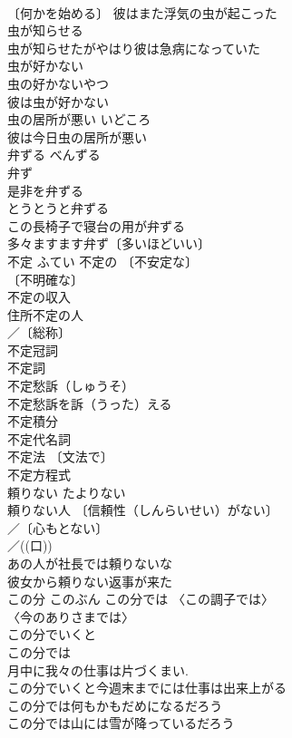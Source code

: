 \documentclass[8pt]{extreport}
\begin{document}
\begin{CJK}{UTF8}{min}
\\	〔何かを始める〕 彼はまた浮気の虫が起こった 
\\	虫が知らせる		
\\	虫が知らせたがやはり彼は急病になっていた 
\\	虫が好かない		
\\	虫の好かないやつ 
\\	彼は虫が好かない 
\\	虫の居所が悪い	いどころ	
\\	彼は今日虫の居所が悪い 
\\	弁ずる	べんずる	
\\	弁ず 
\\	是非を弁ずる 
\\	とうとうと弁ずる 
\\	この長椅子で寝台の用が弁ずる 
\\	多々ますます弁ず〔多いほどいい〕 
\\	不定	ふてい	不定の 〔不安定な〕
\\	〔不明確な〕
\\	不定の収入 
\\	住所不定の人 
\\	／〔総称〕
\\	不定冠詞 
\\	不定詞 
\\	不定愁訴（しゅうそ） 
\\	不定愁訴を訴（うった）える 
\\	不定積分 
\\	不定代名詞 
\\	不定法 〔文法で〕
\\	不定方程式 
\\	頼りない	たよりない	
\\	頼りない人 〔信頼性（しんらいせい）がない〕
\\	／〔心もとない〕
\\	／((口)) 
\\	あの人が社長では頼りないな 
\\	彼女から頼りない返事が来た 
\\	この分	このぶん	この分では 〈この調子では〉 
\\	〈今のありさまでは〉 
\\	この分でいくと 
\\	この分では 
\\	月中に我々の仕事は片づくまい. 
\\	この分でいくと今週末までには仕事は出来上がる 
\\	この分では何もかもだめになるだろう 
\\	この分では山には雪が降っているだろう 

\end{CJK}
\end{document}

